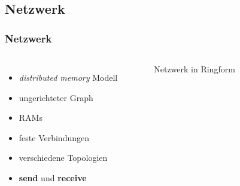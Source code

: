 \subsection{Netzwerk}
\begin{frame}
    \frametitle{Netzwerk}
    \begin{columns}
        \begin{itemize}
            \item \emph{distributed memory} Modell
            \item ungerichteter Graph
            \item RAMs
            \item feste Verbindungen
            \item verschiedene Topologien
            \item \textbf{send} und \textbf{receive}
        \end{itemize}
        \begin{figure}
            \centering
            
            \caption{Netzwerk in Ringform}
        \end{figure}
    \end{columns}
\end{frame}

